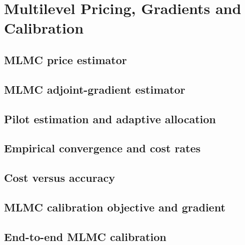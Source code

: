 \chapter{Multilevel Pricing, Gradients and Calibration}
\label{ch:mlmc}

\section{MLMC price estimator}
\label{sec:mlmc-price}

\section{MLMC adjoint-gradient estimator}
\label{sec:mlmc-gradient}

\section{Pilot estimation and adaptive allocation}
\label{sec:mlmc-allocation}

\section{Empirical convergence and cost rates}
\label{sec:mlmc-rates}

\section{Cost versus accuracy}
\label{sec:mlmc-cost}

\section{MLMC calibration objective and gradient}
\label{sec:mlmc-objective}

\section{End-to-end MLMC calibration}
\label{sec:mlmc-calibration}
